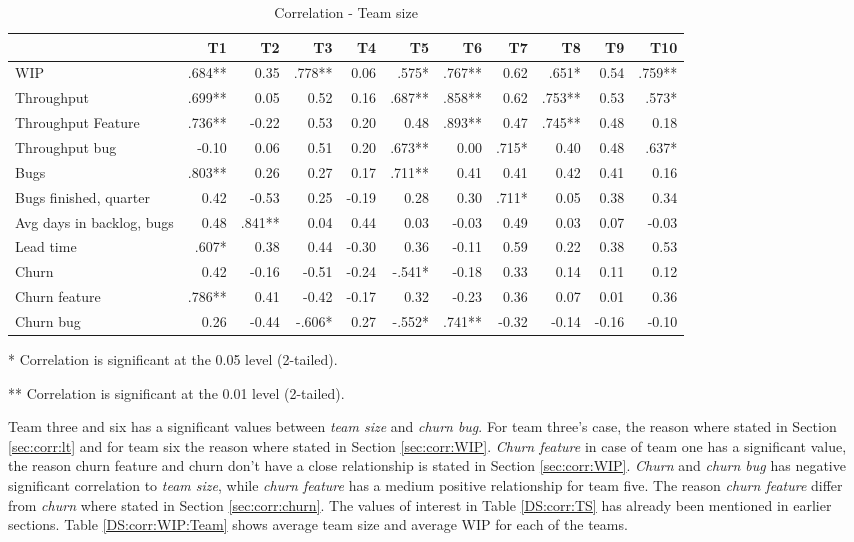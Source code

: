 \documentclass[UKenglish]{ifimaster}  %
\begin{document}
 \begin{table}[!htbp]
  \begin{adjustwidth}{-2.5cm}{}
 \centering
 \begin{tabular}{|l|r|r|r|r|r|r|r|r|r|r|}
\hline
 & \bf{T1} & \bf{T2} & \bf{T3} & \bf{T4} & \bf{T5} & \bf{T6} & \bf{T7} & \bf{T8} & \bf{T9} & \bf{T10}\\ \hline
WIP &.684**& 0.35& .778**& 0.06& .575*& .767**& 0.62& .651*& 0.54& .759**\\ \hline
Throughput &.699**& 0.05& 0.52& 0.16& .687**& .858**& 0.62& .753**& 0.53& .573*\\ \hline
Throughput Feature &.736**& -0.22& 0.53& 0.20& 0.48& .893**& 0.47& .745**& 0.48& 0.18\\ \hline
Throughput bug &-0.10& 0.06& 0.51& 0.20& .673**& 0.00& .715*& 0.40& 0.48& .637*\\ \hline
Bugs & .803**& 0.26& 0.27& 0.17& .711**& 0.41& 0.41& 0.42& 0.41& 0.16\\ \hline
Bugs finished, quarter &0.42& -0.53& 0.25& -0.19& 0.28& 0.30& .711*& 0.05& 0.38& 0.34\\ \hline
Avg days in backlog, bugs &0.48& .841**& 0.04& 0.44& 0.03& -0.03& 0.49& 0.03& 0.07& -0.03\\ \hline
Lead time &.607*& 0.38& 0.44& -0.30& 0.36& -0.11& 0.59& 0.22& 0.38& 0.53\\ \hline
Churn &0.42& -0.16& -0.51& -0.24& -.541*& -0.18& 0.33& 0.14& 0.11& 0.12\\ \hline
Churn feature &.786**& 0.41& -0.42& -0.17& 0.32& -0.23& 0.36& 0.07& 0.01& 0.36\\ \hline
Churn bug &0.26& -0.44& -.606*& 0.27& -.552*& .741**& -0.32& -0.14& -0.16& -0.10\\ \hline
\end{tabular}
 \caption{Correlation - Team size}
 \label{corr:Teams}
 \centerline {* Correlation is significant at the 0.05 level (2-tailed).}
\centerline{** Correlation is significant at the 0.01 level (2-tailed).}
\end{adjustwidth}
\end{table}
 Team three and six has a significant values between \textit{team size} and \textit{churn bug}. For team three's case, the reason where stated in Section \ref{sec:corr:lt} and for team six the reason where stated in Section \ref{sec:corr:WIP}. \textit{Churn feature} in case of team one has a significant value, the reason churn feature and churn don't have a close relationship is stated in Section \ref{sec:corr:WIP}. \textit{Churn} and \textit{churn bug} has negative significant correlation to \textit{team size}, while \textit{churn feature} has a medium positive relationship for team five. The reason \textit{churn feature} differ from \textit{churn} where stated in Section \ref{sec:corr:churn}. The values of interest in Table \ref{DS:corr:TS} has already been mentioned in earlier sections. Table \ref{DS:corr:WIP:Team} shows average team size and average WIP for each of the teams.
\end{document}
